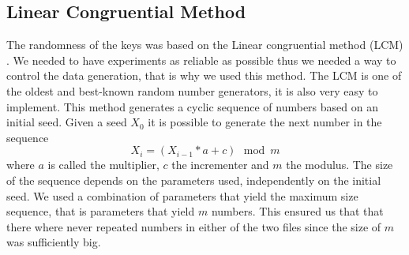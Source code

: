 \documentclass{article}
\begin{document}
        \subsection*{Linear Congruential Method}
        The randomness of the keys was based on the Linear congruential method (LCM) \cite{BOOK:2}. 
        We needed to have experiments as reliable as possible thus we needed a way to control the data generation, 
        that is why we used this method. The LCM is one of the oldest and best-known random number generators, 
        it is also very easy to implement. This method generates a cyclic sequence of numbers based on an initial seed. 
        Given a seed $X_0$ it is possible to generate the next number in the sequence 
        \begin{equation}
        X_i = (X_{i-1} * a + c) \, \bmod m
        \end{equation}
         where $a$ is called the multiplier, $c$ the incrementer and $m$ the modulus. 
         The size of the sequence depends on the parameters used, independently on the initial seed.
          We used a combination of parameters that yield the maximum size sequence, that is parameters that yield $m$ numbers.  
          This ensured us that that there where never repeated numbers in either of the two files since the size of $m$ was
          sufficiently big. 
          
           
\end{document}
